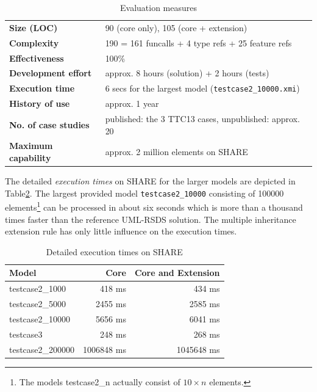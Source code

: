 \documentclass[submission]{eptcs}
\begin{document}
\begin{table}[htb]
  \footnotesize
  \centering
  \begin{tabular}{| l | l |}
    \hline
    \textbf{Size (LOC)}         & 90 (core only), 105 (core + extension)\\
    \textbf{Complexity}         & 190 = 161 funcalls + 4 type refs + 25 feature refs\\
    \textbf{Effectiveness}      & 100\%\\
    \textbf{Development effort} & approx. 8 hours (solution) + 2 hours (tests)\\
    \textbf{Execution time}     & 6 secs for the largest model (\verb|testcase2_10000.xmi|)\\
    \textbf{History of use}     & approx. 1 year\\
    \textbf{No. of case studies}& published: the 3 TTC13 cases, unpublished: approx. 20\\
    \textbf{Maximum capability} & approx. 2 million elements on SHARE\\
    \hline
  \end{tabular}
  \caption{Evaluation measures}
  \label{tab:evaluation}
\end{table}

The detailed \emph{execution times} on SHARE for the larger models are depicted
in Table\ref{tab:exec-times}.  The largest provided model
\verb|testcase2_10000| consisting of 100000 elements\footnote{The models
  \textsf{testcase2\_n} actually consist of $10\times n$ elements.} can be
processed in about six seconds which is more than a thousand times faster than
the reference UML-RSDS solution.  The multiple inheritance extension rule has
only little influence on the execution times.

\begin{table}[htb]
  \footnotesize
  \centering
  \begin{tabular}{| l | r | r |}
    \hline
    \textbf{Model}    & \textbf{Core} & \textbf{Core and Extension}\\
    \hline
    \textsf{testcase2\_1000}   & 418 ms    & 434 ms\\
    \textsf{testcase2\_5000}   & 2455 ms   & 2585 ms\\
    \textsf{testcase2\_10000}  & 5656 ms   & 6041 ms\\
    \textsf{testcase3}         & 248 ms    & 268 ms\\
    \hline
    \textsf{testcase2\_200000} & 1006848 ms & 1045648 ms\\
    \hline
  \end{tabular}
  \caption{Detailed execution times on SHARE}
  \label{tab:exec-times}
\end{table}
\end{document}
